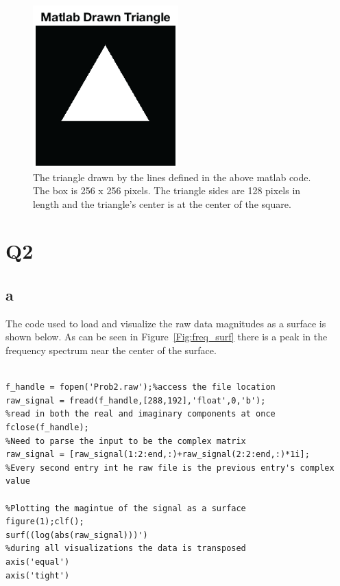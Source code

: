 \documentclass[12pt]{article}
\begin{document}
\begin{figure}[h]
	 \centering
	\includegraphics[width=0.5\textwidth]{Figures/matlabTriangle.png}
	\caption{The triangle drawn by the lines defined in the above matlab code. The box is 256 x 256 pixels. The triangle sides are 128 pixels in length and the triangle's center is at the center of the square.}
	\label{Fig:Matlab_Triangle}
\end{figure}


\section{Q2}\vspace{-.2in}
\subsection{a}

The code used to load and visualize the raw data magnitudes as a surface is shown below. As can be seen in Figure~\ref{Fig:freq_surf} there is a peak in the frequency spectrum near the center of the surface.
\begin{lstlisting}[style=Matlab-editor]
%plotblem 2

f_handle = fopen('Prob2.raw');%access the file location
raw_signal = fread(f_handle,[288,192],'float',0,'b');
%read in both the real and imaginary components at once
fclose(f_handle);
%Need to parse the input to be the complex matrix
raw_signal = [raw_signal(1:2:end,:)+raw_signal(2:2:end,:)*1i];
%Every second entry int he raw file is the previous entry's complex value

%Plotting the magintue of the signal as a surface
figure(1);clf();
surf((log(abs(raw_signal)))')
%during all visualizations the data is transposed
axis('equal')
axis('tight')
\end{lstlisting}
\end{document}
